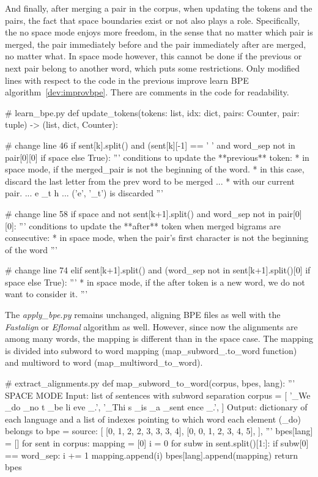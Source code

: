 And finally, after merging a pair in the corpus, when updating the tokens and the pairs, the fact that space boundaries exist or not also plays a role. Specifically, the no space mode enjoys more freedom, in the sense that no matter which pair is merged, the pair immediately before and the pair immediately after are merged, no matter what. In space mode however, this cannot be done if the previous or next pair belong to another word, which puts some restrictions. Only modified lines with respect to the code in the previous improve learn BPE algorithm~\ref{dev:improvbpe}. There are comments in the code for readability.

\begin{python}
# learn_bpe.py
def update_tokens(tokens: list, idx: dict, pairs: Counter, pair: tuple) -> (list, dict, Counter):

# change line 46
if sent[k].split() and (sent[k][-1] == ' ' and word_sep not in pair[0][0] if space else True):
  '''
  conditions to update the **previous** token:
  * in space mode, if the merged_pair is not the beginning of the word.
    * in this case, discard the last letter from the prev word to be merged ...
    * with our current pair. ... e _t h ... ('e', '_t') is discarded
  '''

# change line 58
if space and not sent[k+1].split() and word_sep not in pair[0][0]:
  '''
  conditions to update the **after** token when merged bigrams are consecutive:
  * in space mode, when the pair's first character is not the beginning of the word
  '''

# change line 74
elif sent[k+1].split() and (word_sep not in sent[k+1].split()[0] if space else True):
  '''
  * in space mode, if the after token is a new word, we do not want to consider it.
  '''
\end{python}

The \emph{apply\_bpe.py} remains unchanged, aligning BPE files as well with the \emph{Fastalign} or \emph{Eflomal} algorithm as well. However, since now the alignments are among many words, the mapping is different than in the space case. The mapping is divided into subword to word mapping (map\_subword\_.to\_word function) and multiword to word (map\_multiword\_to\_word).

\begin{python}
# extract_alignments.py
def map_subword_to_word(corpus, bpes, lang):
  '''
  SPACE MODE
  Input: list of sentences with subword separation
  corpus =  [
    '_We _do _no t _be li eve _.',
    '_Thi s _is _a _sent ence _.',
  ]
  Output: dictionary of each language and 
  a list of indexes pointing to which word each element (_do) belongs to
  bpe = {
    source:
    [
      [0, 1, 2, 2, 3, 3, 3, 4],
      [0, 0, 1, 2, 3, 4, 5],
    ],
  }
  '''
  bpes[lang] = []
  for sent in corpus:
    mapping = [0]
    i = 0
    for subw in sent.split()[1:]:
      if subw[0] == word_sep:
        i += 1
      mapping.append(i)
    bpes[lang].append(mapping)
  return bpes
\end{python}

